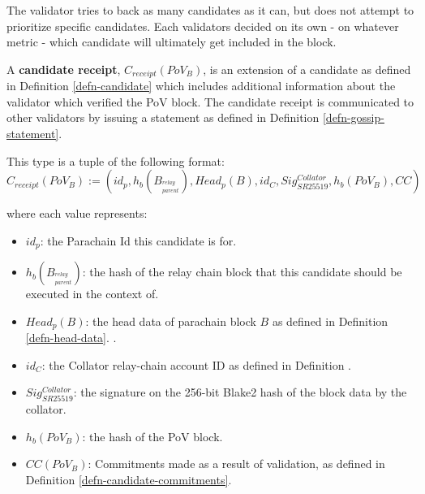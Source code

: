 The validator tries to back as many candidates as it can, but does not attempt to prioritize
specific candidates. Each validators decided on its own - on whatever metric - which candidate
will ultimately get included in the block.

\begin{definition}
  \label{defn-candidate-receipt}
  A \textbf{candidate receipt}, $C_{receipt}(PoV_B)$, is an extension of a candidate
  as defined in Definition \ref{defn-candidate} which includes additional
  information about the validator which verified the PoV block. The candidate
  receipt is communicated to other validators by issuing a statement as defined
  in Definition \ref{defn-gossip-statement}.
  \newline

  This type is a tuple of the following format:
  \[
  C_{receipt}(PoV_B) := (id_p, h_b({B_{^{relay}_{parent}}}), Head_p(B), id_{C}, Sig^{Collator}_{SR25519}, h_b({PoV_B}), CC)
  \]

  where each value represents:
  \begin{itemize}
    \item $id_p$: the Parachain Id this candidate is for.
    \item $h_b({B_{^{relay}_{parent}}})$: the hash of the relay chain block that this
    candidate should be executed in the context of.
    \item $Head_p(B)$: the head data of parachain block $B$ as defined in Definition \ref{defn-head-data}.
    .
    \item $id_C$: the Collator relay-chain account ID as defined in Definition
    .
    \item $Sig^{Collator}_{SR25519}$: the signature on the 256-bit Blake2 hash
    of the block data by the collator.
    \item $h_b({PoV_B})$: the hash of the PoV block.
    \item $CC(PoV_B)$: Commitments made as a result of validation, as defined in
    Definition \ref{defn-candidate-commitments}.
  \end{itemize}
\end{definition}

